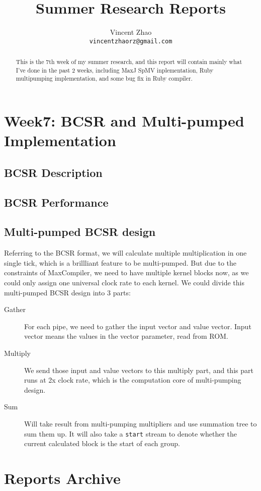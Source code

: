 \documentclass[a4paper, 10pt]{article}
\begin{document}
\title{Summer Research Reports}
\author{Vincent Zhao\\
		\texttt{vincentzhaorz@gmail.com}}
\maketitle

\begin{abstract}
This is the 7th week of my summer research, and this report will contain mainly what I've done in the past 2 weeks, including MaxJ SpMV inplementation, Ruby multipumping implementation, and some bug fix in Ruby compiler.
\end{abstract}
\newpage

\tableofcontents

\newpage


\section{Week7: BCSR and Multi-pumped Implementation}

\subsection{BCSR Description}

\subsection{BCSR Performance}

\subsection{Multi-pumped BCSR design}

Referring to the BCSR format, we will calculate multiple multiplication in one single tick, which is a brillliant feature to be multi-pumped. But due to the constraints of MaxCompiler, we need to have multiple kernel blocks now, as we could only assign one universal clock rate to each kernel. We could divide this multi-pumped BCSR design into 3 parts:

\begin{description}
\item[Gather] For each pipe, we need to gather the input vector and value vector. Input vector means the values in the vector parameter, read from ROM. 
\item[Multiply] We send those input and value vectors to this multiply part, and this part runs at 2x clock rate, which is the computation core of multi-pumping design.
\item[Sum] Will take result from multi-pumping multipliers and use summation tree to sum them up. It will also take a \texttt{start} stream to denote whether the current calculated block is the start of each group.
\end{description}



\newpage

\section{Reports Archive}
 \newpage
 \newpage
 \newpage
   
\end{document}

